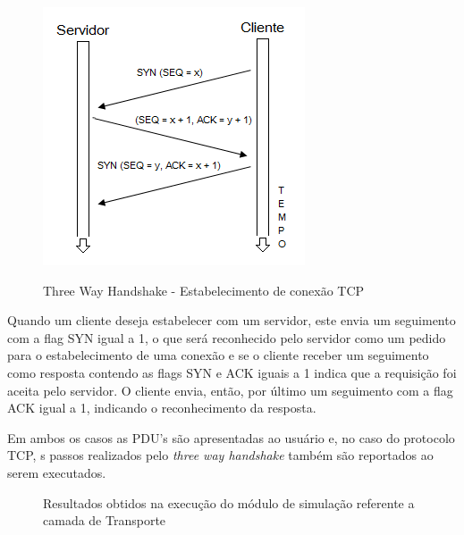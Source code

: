 \begin{figure}
	\centering
	\includegraphics{04-figuras/3wh.png}
	\caption{Three Way Handshake - Estabelecimento de conexão TCP}
	\cite{TANENBAUM}
	\label{fig:3wh}
\end{figure}

Quando um cliente deseja estabelecer  com  um servidor, este envia um seguimento com a flag SYN igual a 1, o que ser\'a reconhecido pelo servidor como um pedido para o estabelecimento de uma conex\~ao e se o cliente receber um seguimento como resposta contendo as flags SYN e ACK iguais a 1 indica que a requisiç\~ao foi aceita pelo servidor. O cliente envia, ent\~ao, por \'ultimo um seguimento com a flag ACK igual a 1, indicando o reconhecimento da resposta.

Em ambos os casos as PDU's são apresentadas ao usuário e, no caso do protocolo TCP, s passos realizados pelo \textit{three way handshake} também são reportados ao serem executados. 

\begin{figure}[H]
	\centering
	\caption{Resultados obtidos na execução do módulo de simulação referente a camada de Transporte}
	\label{fig:transOutput}
\end{figure}